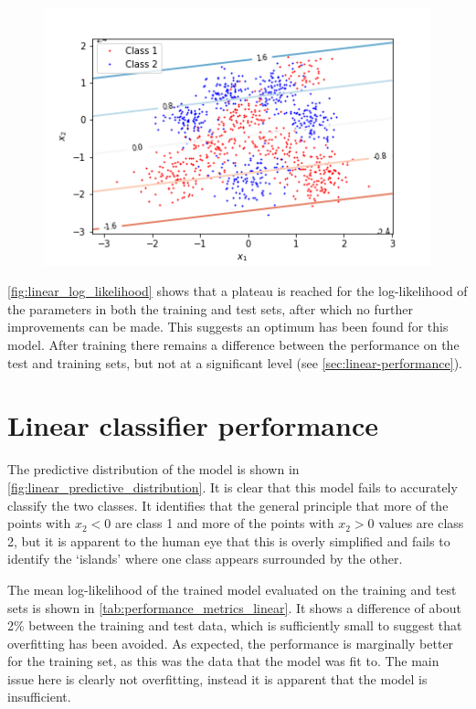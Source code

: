 \documentclass[a4paper]{article}
\begin{document}
\begin{figure}
\begin{minipage}{0.32\textwidth}
            \label{fig:linear_predictive_distribution}
            \centering
            \includegraphics[width=\textwidth]{plots/predictive_distribution_linear.png}
        \end{minipage}
    \end{figure}

    \autoref{fig:linear_log_likelihood} shows that a plateau is reached for the log-likelihood of the parameters in both the
    training and test sets, after which no further improvements can be made. This suggests an optimum has been found for
    this model. After training there remains a difference between the performance on the test and training sets, but not
    at a significant level (see \autoref{sec:linear-performance}).

    \section{Linear classifier performance}\label{sec:linear-performance}
    The predictive distribution of the model is shown in \autoref{fig:linear_predictive_distribution}. It is clear that
    this model fails to accurately classify the two classes. It identifies that the general principle that more of the
    points with $x_2 < 0$ are class 1 and more of the points with $x_2 > 0$ values are class 2, but it is apparent to
    the human eye that this is overly simplified and fails to identify the `islands' where one class appears surrounded
    by the other.

    The mean log-likelihood of the trained model evaluated on the training and test sets is shown in
    \autoref{tab:performance_metrics_linear}. It shows a difference of about 2\% between the training and test data, which is
    sufficiently small to suggest that overfitting has been avoided. As expected, the performance is marginally better
    for the training set, as this was the data that the model was fit to. The main issue here is clearly not overfitting,
    instead it is apparent that the model is insufficient.
\end{document}
